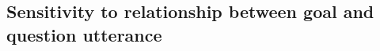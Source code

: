 \documentclass[12pt, floatsintext, jou]{apa6}
\begin{document}



\subsection{Sensitivity to relationship between goal and question utterance}

\end{document}
